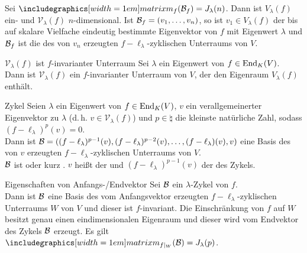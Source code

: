 \begin{Bem}
    Sei $\matrixm_f(\basis{B}_f) = J_\lambda(n)$.
    Dann ist $V_\lambda(f)$ ein- und $\mathcal{V}_\lambda(f)$ $n$-dimensional.
    Ist $\mathcal{B}_f = (v_1, \dotsc, v_n)$, so ist $v_1 \in V_\lambda(f)$ der
    bis auf skalare Vielfache eindeutig bestimmte Eigenvektor von $f$ mit
    Eigenwert $\lambda$ und $\mathcal{B}_f$ ist die  des
    von $v_n$ erzeugten $f - \ell_\lambda$-zyklischen Unterraums von $V$.
\end{Bem}

\begin{Satz}{$\mathcal{V}_\lambda(f)$ ist $f$-invarianter Unterraum}
    Sei $\lambda$ ein Eigenwert von $f \in \operatorname{End}_K(V)$. \\
    Dann ist $\mathcal{V}_\lambda(f)$ ein $f$-invarianter Unterraum von $V$,
    der den Eigenraum $V_\lambda(f)$ enthält.
\end{Satz}

\begin{Def}{Zykel}
    Seien $\lambda$ ein Eigenwert von $f \in \operatorname{End}_K(V)$, $v$ ein
    verallgemeinerter Eigenvektor zu $\lambda$
    (d.\,h. $v \in \mathcal{V}_\lambda(f)$)
    und $p \in \natural$ die kleinste
    natürliche Zahl, sodass $(f - \ell_\lambda)^p(v) = 0$. \\
    Dann ist $\mathcal{B} = ((f - \ell_\lambda)^{p-1}(v),
    (f - \ell_\lambda)^{p-2}(v), \dotsc, (f - \ell_\lambda)(v), v)$
    eine Basis des von $v$ erzeugten $f - \ell_\lambda$-zyklischen Unterraums
    von $V$. \\
    $\mathcal{B}$ ist  oder kurz .
    $v$ heißt der  und $(f - \ell_\lambda)^{p-1}(v)$
    der  des Zykels.
\end{Def}

\begin{Satz}{Eigenschaften von Anfangs-/Endvektor}
    Sei $\mathcal{B}$ ein $\lambda$-Zykel von $f$. \\
    Dann ist $\mathcal{B}$ eine Basis des vom Anfangsvektor erzeugten
    $f - \ell_\lambda$-zyklischen Unterraums $W$ von $V$ und dieser
    ist $f$-invariant.
    Die Einschränkung von $f$ auf $W$ besitzt genau einen eindimensionalen
    Eigenraum und dieser wird vom Endvektor des Zykels $\mathcal{B}$ erzeugt.
    Es gilt $\enmatrix{f|_W}{B} = J_\lambda(p)$.
\end{Satz}

